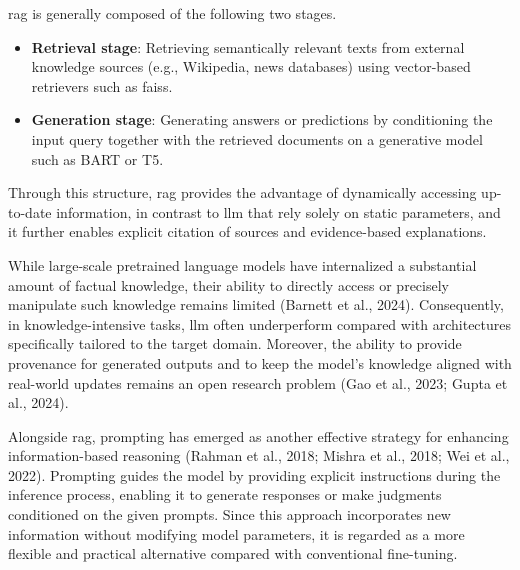 \documentclass[a4paper,fleqn]{cas-sc}
\begin{document}
\gls{rag} is generally composed of the following two stages.
\begin{itemize}
    \item{\textbf{Retrieval stage}:
    Retrieving semantically relevant texts from external knowledge sources (e.g., Wikipedia, news databases) using vector-based retrievers such as \gls{faiss}.}
    \item{\textbf{Generation stage}:
    Generating answers or predictions by conditioning the input query together with the retrieved documents on a generative model such as BART or T5.}
\end{itemize}
Through this structure, \gls{rag} provides the advantage of dynamically accessing up-to-date information, in contrast to \gls{llm} that rely solely on static parameters, and it further enables explicit citation of sources and evidence-based explanations.

While large-scale pretrained language models have internalized a substantial amount of factual knowledge, their ability to directly access or precisely manipulate such knowledge remains limited (Barnett et al., 2024). Consequently, in knowledge-intensive tasks, \gls{llm} often underperform compared with architectures specifically tailored to the target domain. Moreover, the ability to provide provenance for generated outputs and to keep the model's knowledge aligned with real-world updates remains an open research problem (Gao et al., 2023; Gupta et al., 2024).

Alongside \gls{rag}, prompting has emerged as another effective strategy for enhancing information-based reasoning (Rahman et al., 2018; Mishra et al., 2018; Wei et al., 2022). Prompting guides the model by providing explicit instructions during the inference process, enabling it to generate responses or make judgments conditioned on the given prompts. Since this approach incorporates new information without modifying model parameters, it is regarded as a more flexible and practical alternative compared with conventional fine-tuning.
\end{document}
